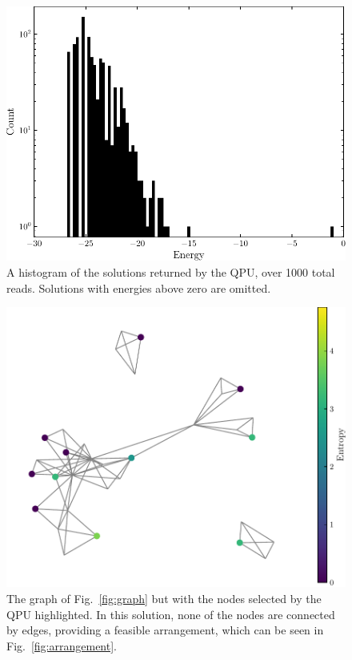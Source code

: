 \documentclass[aps,pra,10pt,twocolumn]{revtex4-2}
\begin{document}
\begin{figure}[h]
    \centering
    \includegraphics[width=\linewidth]{../Figures/histogram.pdf}
    \caption{A histogram of the solutions returned by the QPU, over 1000 total reads. Solutions with energies above zero are omitted.}
    \label{fig:histogram}
\end{figure}

\begin{figure}[h]
    \centering
    \includegraphics[width=\linewidth]{../Figures/solutionGraph.pdf}
    \caption{The graph of Fig.\ \ref{fig:graph} but with the nodes selected by the QPU highlighted. In this solution, none of the nodes are connected by edges, providing a feasible arrangement, which can be seen in Fig.\ \ref{fig:arrangement}.}
    \label{fig:solution}
\end{figure}
\end{document}
